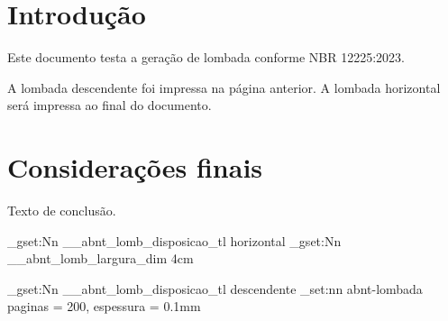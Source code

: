 \documentclass[a4paper, 12pt]{report}
\begin{document}
\imprimirlombada

\chapter{Introdução}

Este documento testa a geração de lombada conforme NBR 12225:2023.

A lombada descendente foi impressa na página anterior. A lombada horizontal
será impressa ao final do documento.

\chapter{Considerações finais}

Texto de conclusão.

\ExplSyntaxOn
\tl_gset:Nn \g__abnt_lomb_disposicao_tl { horizontal }
\dim_gset:Nn \g__abnt_lomb_largura_dim { 4cm }  %
\ExplSyntaxOff

\imprimirlombada

\ExplSyntaxOn
\tl_gset:Nn \g__abnt_lomb_disposicao_tl { descendente }
\keys_set:nn { abnt-lombada } { paginas = 200, espessura = 0.1mm }
\ExplSyntaxOff

\lombadaLogomarcaTexto{}%

\imprimirlombada
\end{document}
